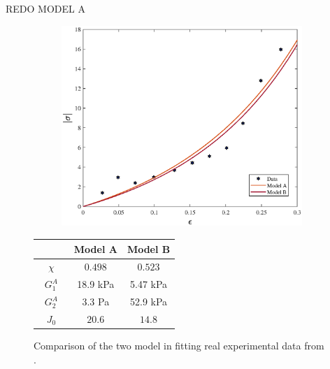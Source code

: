\documentclass[runningheads]{llncs}
\begin{document}
REDO MODEL A
\begin{figure}
	\hspace{-8mm}
	\begin{subfigure}{0.65\textwidth}
		\hspace{6mm}
		\includegraphics[scale=0.35]{images/compression.eps}
		\caption{}
	\end{subfigure}
\hspace{6mm}
	\begin{subtable}{0.32\textwidth}
			\begin{tabular}{||c | c | c|| }		
				\hline\addlinespace[2pt]
				& Model A & Model B\\[0.5mm]
				\hline\addlinespace[2pt]
				$\quad \chi\quad$ & $\quad0.498\quad$&$\quad0.523\quad$\\[0.5mm]
				$G^A_1$ & 18.9 kPa& 5.47 kPa\\[0.5mm]
				$G^A_2$ & 3.3 Pa& 52.9 kPa\\[0.5mm]
				$J_0$ & $20.6$& $14.8$\\[0.5mm]
				\hline
			\end{tabular}	
		\caption{}
	\end{subtable}
\caption{Comparison of the two model in fitting real experimental data from \cite{Netti}.}
\end{figure}
\newpage
\appendix
\end{document}
